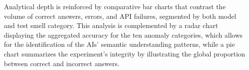 \documentclass[sigconf]{acmart}
\begin{document}

Analytical depth is reinforced by comparative bar charts that contrast the volume of correct answers, errors, and API failures, segmented by both model and test smell category. This analysis is complemented by a radar chart displaying the aggregated accuracy for the ten anomaly categories, which allows for the identification of the AIs' semantic understanding patterns, while a pie chart summarizes the experiment's integrity by illustrating the global proportion between correct and incorrect answers.

\end{document}
